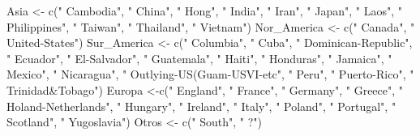 \documentclass[]{article}
\newenvironment{Shaded}{\begin{snugshade}}{\end{snugshade}}
\newcommand{\KeywordTok}[1]{\textcolor[rgb]{0.94,0.87,0.69}{#1}}
\newcommand{\NormalTok}[1]{\textcolor[rgb]{0.80,0.80,0.80}{#1}}
\newcommand{\StringTok}[1]{\textcolor[rgb]{0.80,0.58,0.58}{#1}}
\begin{document}
\begin{Shaded}
\begin{Highlighting}[]
\NormalTok{Asia \textless{}{-}}\StringTok{ }\KeywordTok{c}\NormalTok{(}\StringTok{" Cambodia"}\NormalTok{, }\StringTok{" China"}\NormalTok{, }\StringTok{" Hong"}\NormalTok{, }\StringTok{" India"}\NormalTok{, }\StringTok{" Iran"}\NormalTok{, }\StringTok{" Japan"}\NormalTok{, }\StringTok{" Laos"}\NormalTok{, }\StringTok{" Philippines"}\NormalTok{, }\StringTok{" Taiwan"}\NormalTok{, }\StringTok{" Thailand"}\NormalTok{, }\StringTok{" Vietnam"}\NormalTok{)}
\NormalTok{Nor\_America \textless{}{-}}\StringTok{ }\KeywordTok{c}\NormalTok{(}\StringTok{" Canada"}\NormalTok{, }\StringTok{" United{-}States"}\NormalTok{)}
\NormalTok{Sur\_America \textless{}{-}}\StringTok{ }\KeywordTok{c}\NormalTok{(}\StringTok{" Columbia"}\NormalTok{, }\StringTok{" Cuba"}\NormalTok{, }\StringTok{" Dominican{-}Republic"}\NormalTok{, }\StringTok{" Ecuador"}\NormalTok{, }\StringTok{" El{-}Salvador"}\NormalTok{, }\StringTok{" Guatemala"}\NormalTok{, }\StringTok{" Haiti"}\NormalTok{, }\StringTok{" Honduras"}\NormalTok{, }\StringTok{" Jamaica"}\NormalTok{, }\StringTok{" Mexico"}\NormalTok{, }\StringTok{" Nicaragua"}\NormalTok{, }\StringTok{" Outlying{-}US(Guam{-}USVI{-}etc"}\NormalTok{, }\StringTok{" Peru"}\NormalTok{, }\StringTok{" Puerto{-}Rico"}\NormalTok{, }\StringTok{" Trinidad\&Tobago"}\NormalTok{)}
\NormalTok{Europa \textless{}{-}}\KeywordTok{c}\NormalTok{(}\StringTok{" England"}\NormalTok{, }\StringTok{" France"}\NormalTok{, }\StringTok{" Germany"}\NormalTok{, }\StringTok{" Greece"}\NormalTok{, }\StringTok{" Holand{-}Netherlands"}\NormalTok{, }\StringTok{" Hungary"}\NormalTok{, }\StringTok{" Ireland"}\NormalTok{, }\StringTok{" Italy"}\NormalTok{, }\StringTok{" Poland"}\NormalTok{, }\StringTok{" Portugal"}\NormalTok{, }\StringTok{" Scotland"}\NormalTok{, }\StringTok{" Yugoslavia"}\NormalTok{)}
\NormalTok{Otros \textless{}{-}}\StringTok{ }\KeywordTok{c}\NormalTok{(}\StringTok{" South"}\NormalTok{, }\StringTok{" ?"}\NormalTok{)}
\end{Highlighting}
\end{Shaded}
\end{document}
